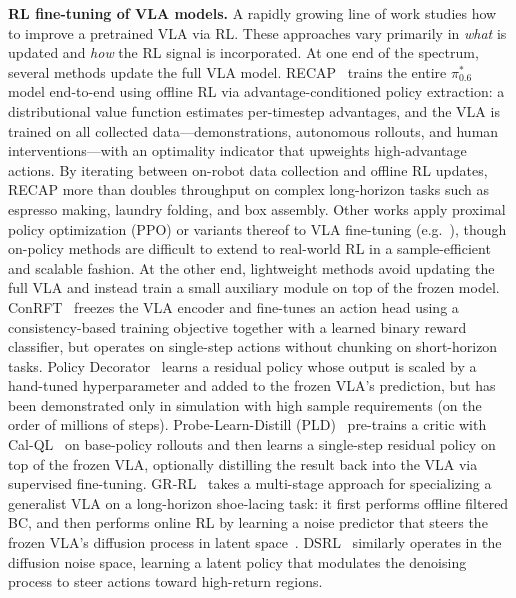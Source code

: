 \textbf{RL fine-tuning of VLA models.}
A rapidly growing line of work studies how to improve a pretrained VLA via RL.
These approaches vary primarily in \emph{what} is updated and \emph{how} the RL signal is incorporated. 
At one end of the spectrum, several methods update the full VLA model.
RECAP~\cite{pi06vla} trains the entire $\pi^*_{0.6}$ model end-to-end using offline RL via advantage-conditioned policy extraction: a distributional value function estimates per-timestep advantages, and the VLA is trained on all collected data---demonstrations, autonomous rollouts, and human interventions---with an optimality indicator that upweights high-advantage actions.
By iterating between on-robot data collection and offline RL updates, RECAP more than doubles throughput on complex long-horizon tasks such as espresso making, laundry folding, and box assembly.
Other works apply proximal policy optimization (PPO) or variants thereof to VLA fine-tuning (e.g.~\cite{Ren2025DPPO,Chen2025piRL,Li2025SimpleVLA_RL}), though on-policy methods are difficult to extend to real-world RL in a sample-efficient and scalable fashion. 
At the other end, lightweight methods avoid updating the full VLA and instead train a small auxiliary module on top of the frozen model.
ConRFT~\cite{chen2025conrft} freezes the VLA encoder and fine-tunes an action head using a consistency-based training objective together with a learned binary reward classifier, but operates on single-step actions without chunking on short-horizon tasks.
Policy Decorator~\cite{pi_dec} learns a residual policy whose output is scaled by a hand-tuned hyperparameter and added to the frozen VLA's prediction, but has been demonstrated only in simulation with high sample requirements (on the order of millions of steps).
Probe-Learn-Distill (PLD)~\cite{xiao2025selfimprovingvisionlanguageactionmodelsdata} pre-trains a critic with Cal-QL~\cite{nakamoto2023cal} on base-policy rollouts and then learns a single-step residual policy on top of the frozen VLA, optionally distilling the result back into the VLA via supervised fine-tuning.
GR-RL~\cite{li2025grrlgoingdexterousprecise} takes a multi-stage approach for specializing a generalist VLA on a long-horizon shoe-lacing task: it first performs offline filtered BC, and then performs online RL by learning a noise predictor that steers the frozen VLA's diffusion process in latent space~\citep{Wagenmaker2025DSRL}.
DSRL~\cite{Wagenmaker2025DSRL} similarly operates in the diffusion noise space, learning a latent policy that modulates the denoising process to steer actions toward high-return regions.
 

